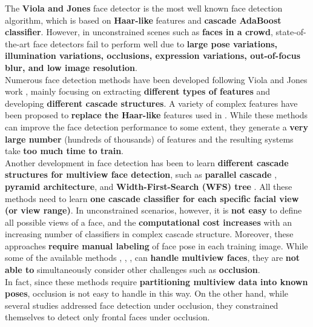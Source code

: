 \documentclass[a4paper,12pt]{article}
\begin{document}
The \textbf{Viola and Jones} face detector \cite{Viola2001Rapid} is the most well 
known face detection algorithm, which is based on \textbf{Haar-like} features and 
\textbf{cascade AdaBoost classifier}\cite{Friedman98additivelogistic}. However, 
in unconstrained scenes such as \textbf{faces in a crowd}, state-of-the-art face 
detectors fail to perform well due to \textbf{large pose variations, illumination variations, occlusions, expression variations, out-of-focus blur, and low image resolution}.\\

Numerous face detection methods have been developed following Viola and Jones work \cite{Viola2001Rapid}, 
mainly focusing on extracting \textbf{different types of features} and developing \textbf{different cascade structures}. 
A variety of complex features have been proposed to \textbf{replace the Haar-like} features used in \cite{Viola2001Rapid}. 
While these methods can improve the face detection performance to some extent,
they generate a \textbf{very large number} (hundreds of thousands) of features and the resulting systems take
\textbf{too much time to train}.\\

Another development in face detection has been to learn \textbf{different cascade structures for multiview face detection}, 
such as \textbf{parallel cascade} \cite{conf/fgr/WuAHL04}, \textbf{pyramid architecture}\cite{journals/pami/LiZ04}, 
and \textbf{Width-First-Search (WFS) tree} \cite{huang_et_al_2007}. All these methods need to learn 
\textbf{one cascade classifier for each specific facial view (or view range)}. In unconstrained scenarios, 
however, it is \textbf{not easy} to define all possible views of a face, and the \textbf{computational cost increases} 
with an increasing number of classifiers in complex cascade structure. Moreover, these approaches \textbf{require manual labeling} 
of face pose in each training image. While some of the available methods 
\cite{conf/fgr/WuAHL04}, \cite{Viola2001Rapid}, \cite{huang_et_al_2007}, can  \textbf{handle multiview faces}, 
they are \textbf{not able to} simultaneously consider other challenges such as  \textbf{occlusion}.\\

In fact, since these methods require  \textbf{partitioning multiview data into known poses}, 
occlusion is not easy to handle in this way. On the other hand, while several studies addressed face detection under occlusion, 
they constrained themselves to detect only frontal faces under occlusion.\\
\end{document}
